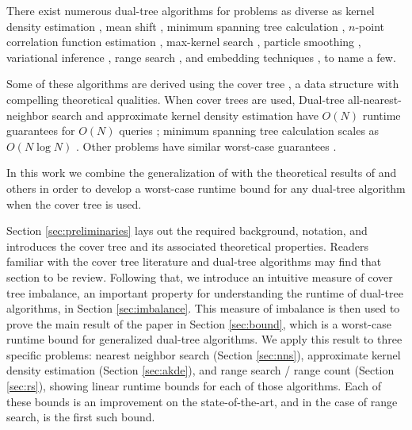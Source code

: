 \documentclass[twoside,11pt]{article} %
\begin{document}
There exist numerous dual-tree algorithms for problems as diverse as kernel
density estimation \citep{gray2003nonparametric}, mean shift \citep{wang2007fast},
minimum spanning tree calculation \citep{march2010euclidean}, $n$-point
correlation function estimation \citep{march2012fast}, max-kernel search
\citep{curtin2013fast}, particle smoothing \citep{klaas2006fast}, variational
inference \citep{amizadeh2012variational}, range search \citep{nbody}, and
embedding techniques \cite{maaten2014accelerating}, to name a few.

Some of these algorithms are derived using the cover tree \citep{langford2006}, a
data structure with compelling theoretical qualities.  When cover trees are
used, Dual-tree all-nearest-neighbor search and approximate kernel density
estimation have $O(N)$ runtime guarantees for $O(N)$ queries \citep{ram2009};
minimum spanning tree calculation scales as $O(N \log N)$
\citep{march2010euclidean}.  Other problems have similar worst-case guarantees
\citep{curtin2014dual, march2013multi}.

In this work we combine the generalization of \citet{curtin2013tree} with the
theoretical results of \citet{langford2006} and others in order to develop a
worst-case runtime bound for any dual-tree algorithm when the cover tree is
used.

Section \ref{sec:preliminaries} lays out the required background, notation, and
introduces the cover tree and its associated theoretical properties.  Readers
familiar with the cover tree literature and dual-tree algorithms
\citep[especially][]{curtin2013tree} may find that section to be review.
Following that, we introduce an intuitive measure of cover tree imbalance, an 
important property for understanding the runtime of dual-tree algorithms, in
Section \ref{sec:imbalance}.  This measure of imbalance is then used to prove
the main result of the paper in Section \ref{sec:bound}, which is a worst-case
runtime bound for generalized dual-tree algorithms.  We apply this result to
three specific problems: nearest neighbor search (Section \ref{sec:nns}),
approximate kernel density estimation (Section \ref{sec:akde}), and range search
/ range count (Section \ref{sec:rs}), showing linear runtime bounds for each of
those algorithms.  Each of these bounds is an improvement on the
state-of-the-art, and in the case of range search, is the first such bound.
\end{document}
